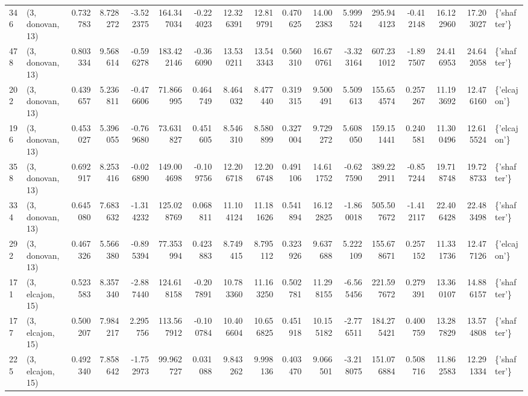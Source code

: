 \begin{tabular}{llrrrrrrrrrrrrrrl}
346 &  (3, donovan, 13) &   0.732783 &   8.728272 &  -3.522375 &   164.347034 &  -0.224023 &  12.326391 &  12.819791 &  0.470625 &  14.002383 &   5.999524 &   295.944123 &  -0.412148 &  16.122960 &  17.203027 &  \{'shafter'\} \\
478 &  (3, donovan, 13) &   0.803334 &   9.568614 &  -0.596278 &   183.422146 &  -0.366090 &  13.530211 &  13.543343 &  0.560310 &  16.670761 &  -3.323164 &   607.231012 &  -1.897507 &  24.416953 &  24.642058 &  \{'shafter'\} \\
202 &  (3, donovan, 13) &   0.439657 &   5.236811 &  -0.476606 &    71.866995 &   0.464749 &   8.464032 &   8.477440 &  0.319315 &   9.500491 &   5.509613 &   155.654574 &   0.257267 &  11.193692 &  12.476160 &  \{'elcajon'\} \\
196 &  (3, donovan, 13) &   0.453027 &   5.396055 &  -0.769680 &    73.631827 &   0.451605 &   8.546310 &   8.580899 &  0.327004 &   9.729272 &   5.608050 &   159.151441 &   0.240581 &  11.300496 &  12.615524 &  \{'elcajon'\} \\
358 &  (3, donovan, 13) &   0.692917 &   8.253416 &  -0.026890 &   149.004698 &  -0.109756 &  12.206718 &  12.206748 &  0.491106 &  14.611752 &  -0.627590 &   389.222911 &  -0.857244 &  19.718748 &  19.728733 &  \{'shafter'\} \\
334 &  (3, donovan, 13) &   0.645080 &   7.683632 &  -1.314232 &   125.028769 &   0.068811 &  11.104124 &  11.181626 &  0.541894 &  16.122825 &  -1.860018 &   505.507672 &  -1.412117 &  22.406428 &  22.483498 &  \{'shafter'\} \\
292 &  (3, donovan, 13) &   0.467326 &   5.566380 &  -0.895394 &    77.353994 &   0.423883 &   8.749415 &   8.795112 &  0.323926 &   9.637688 &   5.222109 &   155.678671 &   0.257152 &  11.331736 &  12.477126 &  \{'elcajon'\} \\
171 &  (3, elcajon, 15) &   0.523583 &   8.357340 &  -2.887440 &   124.618158 &  -0.207891 &  10.783360 &  11.163250 &  0.502781 &  11.298155 &  -6.565456 &   221.597672 &   0.279391 &  13.360107 &  14.886157 &  \{'shafter'\} \\
177 &  (3, elcajon, 15) &   0.500207 &   7.984217 &   2.295756 &   113.567912 &  -0.100784 &  10.406604 &  10.656825 &  0.451918 &  10.155182 &  -2.776511 &   184.275421 &   0.400759 &  13.287829 &  13.574808 &  \{'shafter'\} \\
225 &  (3, elcajon, 15) &   0.492340 &   7.858642 &  -1.752973 &    99.962727 &   0.031088 &   9.843262 &   9.998136 &  0.403470 &   9.066501 &  -3.218075 &   151.076884 &   0.508716 &  11.862583 &  12.291334 &  \{'shafter'\} \\

\end{tabular}
